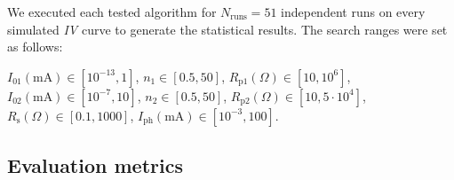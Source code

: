 \documentclass[a4paper,fleqn]{cas-sc}
\begin{document}
We executed each tested algorithm for $N_\mathrm{runs}=51$ independent runs on every  simulated \emph{IV} curve
to generate the statistical results.
The search ranges were set as follows:

\noindent
$I_{01}(\mathrm{mA})\in[10^{-13},1]$,
$n_1\in[0.5,50]$,
$R_\mathrm{p1}(\Omega)\in[10,10^6]$,
$I_{02}(\mathrm{mA})\in[10^{-7},10]$,
$n_2\in[0.5,50]$,
$R_\mathrm{p2}(\Omega)\in[10,5\cdot10^4]$,
$R_\mathrm{s}(\Omega)\in[0.1,1000]$,
$I_\mathrm{ph}(\mathrm{mA})\in[10^{-3},100]$.





\subsection{Evaluation metrics}\label{EvalCr}
\end{document}
